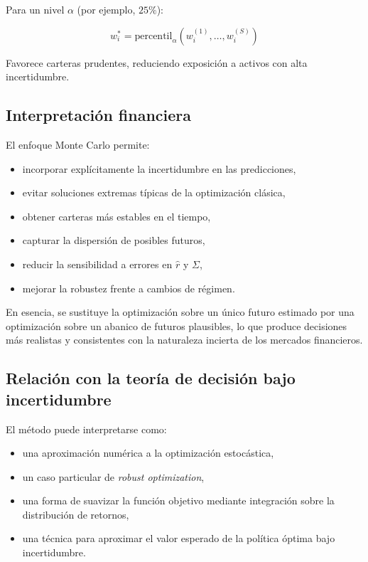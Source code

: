 \documentclass[12pt]{article}
\begin{document}
Para un nivel $\alpha$ (por ejemplo, $25\%$):



\[
w^\ast_i = \text{percentil}_\alpha \left( w^{(1)}_i, \dots, w^{(S)}_i \right)
\]



Favorece carteras prudentes, reduciendo exposición a activos con alta incertidumbre.

\subsection{Interpretación financiera}

El enfoque Monte Carlo permite:

\begin{itemize}
    \item incorporar explícitamente la incertidumbre en las predicciones,
    \item evitar soluciones extremas típicas de la optimización clásica,
    \item obtener carteras más estables en el tiempo,
    \item capturar la dispersión de posibles futuros,
    \item reducir la sensibilidad a errores en $\hat{r}$ y $\Sigma$,
    \item mejorar la robustez frente a cambios de régimen.
\end{itemize}

En esencia, se sustituye la optimización sobre un único futuro estimado por una optimización sobre un abanico de futuros plausibles, lo que produce decisiones más realistas y consistentes con la naturaleza incierta de los mercados financieros.

\subsection{Relación con la teoría de decisión bajo incertidumbre}

El método puede interpretarse como:

\begin{itemize}
    \item una aproximación numérica a la optimización estocástica,
    \item un caso particular de \textit{robust optimization},
    \item una forma de suavizar la función objetivo mediante integración sobre la distribución de retornos,
    \item una técnica para aproximar el valor esperado de la política óptima bajo incertidumbre.
\end{itemize}
\end{document}
